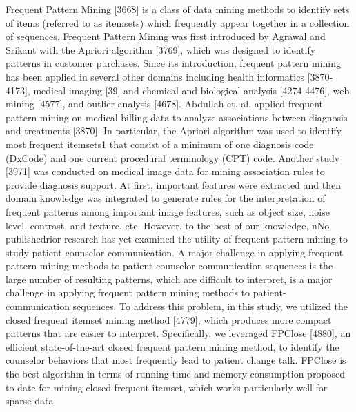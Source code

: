 Frequent Pattern Mining [3668] is a class of data mining methods to identify sets of items (referred to as itemsets) which frequently appear together in a collection of sequences. Frequent Pattern Mining was first introduced by Agrawal and Srikant with the Apriori algorithm [3769], which was designed to identify patterns in customer purchases. Since its introduction, frequent pattern mining has been applied in several other domains including health informatics [3870-4173], medical imaging [39] and chemical and biological analysis [4274-4476], web mining [4577], and outlier analysis [4678]. Abdullah et. al. applied frequent pattern mining on medical billing data to analyze associations between diagnosis and treatments [3870]. In particular, the Apriori algorithm was used to identify most frequent itemsets1 that consist of a minimum of one diagnosis code (DxCode) and one current procedural terminology (CPT) code. Another study [3971] was conducted on medical image data for mining association rules to provide diagnosis support. At first, important features were extracted and then domain knowledge was integrated to generate rules for the interpretation of frequent patterns among important image features, such as object size, noise level, contrast, and texture, etc. However, to the best of our knowledge, nNo publishedrior research has yet examined the utility of frequent pattern mining to study patient-counselor communication. A major challenge in applying frequent pattern mining methods to patient-counselor communication sequences is the large number of resulting patterns, which are difficult to interpret, is a major challenge in applying frequent pattern mining methods to patient- communication sequences. To address this problem, in this study, we utilized the closed frequent itemset mining method [4779], which produces more compact patterns that are easier to interpret. Specifically, we leveraged FPClose [4880], an efficient state-of-the-art closed frequent pattern mining method, to identify the counselor behaviors that most frequently lead to patient change talk. FPClose is the best algorithm in terms of running time and memory consumption proposed to date for mining closed frequent itemset, which works particularly well for sparse data.

